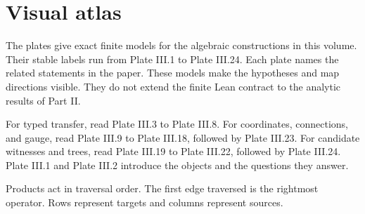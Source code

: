 \documentclass[11pt,letterpaper]{article}
\theoremstyle{plain}
\theoremstyle{definition}
\theoremstyle{remark}
\begin{document}
\section{Visual atlas}\label{app:visual-atlas}
The plates give exact finite models for the algebraic constructions in this volume. Their stable labels run from Plate III.1 to Plate III.24. Each plate names the related statements in the paper. These models make the hypotheses and map directions visible. They do not extend the finite Lean contract to the analytic results of Part II.
\begin{readerroadmap}[title={Three routes through the atlas}]
For typed transfer, read Plate III.3 to Plate III.8. For coordinates, connections, and gauge, read Plate III.9 to Plate III.18, followed by Plate III.23. For candidate witnesses and trees, read Plate III.19 to Plate III.22, followed by Plate III.24. Plate III.1 and Plate III.2 introduce the objects and the questions they answer.
\end{readerroadmap}
Products act in traversal order. The first edge traversed is the rightmost operator. Rows represent targets and columns represent sources.
\clearpage
\begingroup
{}\fontsize{10}{12}\selectfont
\setlength{\parskip}{3pt}\setlength{\abovedisplayskip}{6pt}\setlength{\belowdisplayskip}{6pt}

\endgroup
\clearpage
\begingroup\small{}


\endgroup
\end{document}
